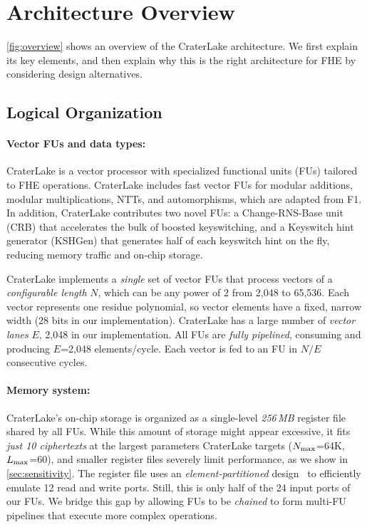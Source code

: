 \section{Architecture Overview}\label{sec:overview}

\autoref{fig:overview} shows an overview of the CraterLake architecture. We first
explain its key elements, and then explain why this is the right architecture
for FHE by considering design alternatives.

\subsection{Logical Organization}

\paragraph{Vector FUs and data types:}
CraterLake is a vector processor with specialized functional units (FUs)
tailored to FHE operations. CraterLake includes fast vector FUs for modular
additions, modular multiplications, NTTs, and automorphisms, which are adapted
from F1. In addition, CraterLake contributes two novel FUs: a Change-RNS-Base
unit (CRB) that accelerates the bulk of boosted keyswitching, and a Keyswitch
hint generator (KSHGen) that generates half of each keyswitch hint on the fly,
reducing memory traffic and on-chip storage.

\figOverview

CraterLake implements a \emph{single} set of vector FUs that process vectors of
a \emph{configurable length} $N$, which can be any power of 2 from 2,048 to
65,536. Each vector represents one residue polynomial, so vector elements have
a fixed, narrow width (28 bits in our implementation). CraterLake has a large
number of \emph{vector lanes} $E$, 2,048 in our implementation. All FUs are
\emph{fully pipelined}, consuming and producing $E$=2,048 elements/cycle. Each
vector is fed to an FU in $N/E$ consecutive cycles.

\paragraph{Memory system:}
CraterLake's on-chip storage is organized as a single-level \emph{256\,MB}
register file shared by all FUs. While this amount of storage might appear
excessive, it fits \emph{just 10 ciphertexts} at the largest parameters
CraterLake targets ($N_{\textrm{max}}$=64K, $L_{\textrm{max}}$=60), and smaller register files
severely limit performance, as we show in \autoref{sec:sensitivity}. The
register file uses an \emph{element-partitioned}
design~\cite{asanovic:ucb98:vector} to efficiently emulate 12 read and write
ports. Still, this is only half of the 24 input ports of our FUs. We bridge
this gap by allowing FUs to be \emph{chained} to form multi-FU pipelines that
execute more complex operations.

